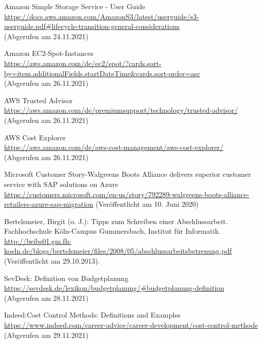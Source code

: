\begin{thebibliography}{HR08}
 Amazon Simple Storage Service - User Guide\\
  \url{https://docs.aws.amazon.com/AmazonS3/latest/userguide/s3-userguide.pdf#lifecycle-transition-general-considerations}\\
  (Abgerufen am 24.11.2021)

 Amazon EC2-Spot-Instances\\
  \url{https://aws.amazon.com/de/ec2/spot/?cards.sort-by=item.additionalFields.startDateTime&cards.sort-order=asc}\\
  (Abgerufen am 26.11.2021)
  
    AWS Trusted Advisor\\
  \url{https://aws.amazon.com/de/premiumsupport/technology/trusted-advisor/}\\
  (Abgerufen am 26.11.2021)

   AWS Cost Explorer\\
  \url{https://aws.amazon.com/de/aws-cost-management/aws-cost-explorer/}\\
  (Abgerufen am 26.11.2021)
  
   Microsoft Customer Story-Walgreens Boots Alliance delivers superior customer service with SAP solutions on Azure \\
  \url{https://customers.microsoft.com/en-us/story/792289-walgreens-boots-alliance-retailers-azure-sap-migration}
  (Veröffentlicht am 10. Juni 2020)

  Bertelsmeier, Birgit (o. J.): Tipps zum Schrei\-b\-en ei\-n\-er Ab\-sch\-luss\-ar\-beit. Fach\-hoch\-schu\-le Köln-Campus Gummersbach, Institut für Informatik. \\
  \url{http://lwibs01.gm.fh-koeln.de/blogs/bertelsmeier/files/2008/05/abschlussarbeitsbetreuung.pdf} (Veröffentlicht am 29.10.2013).

  SevDesk: Definition von Budgetplanung\\
  \url{https://sevdesk.de/lexikon/budgetplanung/#budgetplanung-definition}\\
  (Abgerufen am 28.11.2021)

 Indeed:Cost Control Methods: Definitions and Examples\\
  \url{https://www.indeed.com/career-advice/career-development/cost-control-methods}\\
  (Abgerufen am 29.11.2021)


\end{thebibliography}
